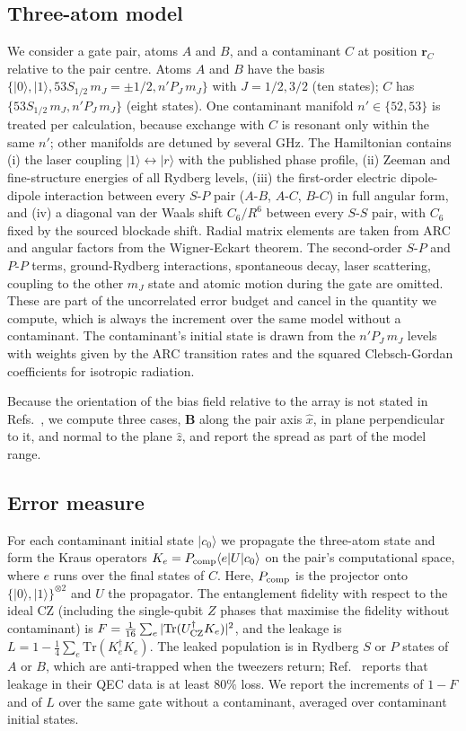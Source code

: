 \documentclass[aps,pra,twocolumn,superscriptaddress,longbibliography,floatfix]{revtex4-2}
\begin{document}
\subsection{Three-atom model}

We consider a gate pair, atoms $A$ and $B$, and a contaminant $C$ at position $\bm r_C$ relative to the pair centre. Atoms $A$ and $B$ have the basis $\{|0\rangle,|1\rangle, 53S_{1/2}\,m_J=\pm1/2, n'P_J\,m_J\}$ with $J=1/2,3/2$ (ten states); $C$ has $\{53S_{1/2}\,m_J, n'P_J\,m_J\}$ (eight states). One contaminant manifold $n'\in\{52,53\}$ is treated per calculation, because exchange with $C$ is resonant only within the same $n'$; other manifolds are detuned by several GHz. The Hamiltonian contains (i) the laser coupling $|1\rangle\leftrightarrow|r\rangle$ with the published phase profile, (ii) Zeeman and fine-structure energies of all Rydberg levels, (iii) the first-order electric dipole-dipole interaction between every $S$-$P$ pair ($A$-$B$, $A$-$C$, $B$-$C$) in full angular form, and (iv) a diagonal van der Waals shift $C_6/R^6$ between every $S$-$S$ pair, with $C_6$ fixed by the sourced blockade shift. Radial matrix elements are taken from ARC and angular factors from the Wigner-Eckart theorem. The second-order $S$-$P$ and $P$-$P$ terms, ground-Rydberg interactions, spontaneous decay, laser scattering, coupling to the other $m_J$ state and atomic motion during the gate are omitted. These are part of the uncorrelated error budget and cancel in the quantity we compute, which is always the increment over the same model without a contaminant. The contaminant's initial state is drawn from the $n'P_J\,m_J$ levels with weights given by the ARC transition rates and the squared Clebsch-Gordan coefficients for isotropic radiation.

Because the orientation of the bias field relative to the array is not stated in Refs.~\cite{Evered2023,Bluvstein2026}, we compute three cases, $\bm B$ along the pair axis $\hat x$, in plane perpendicular to it, and normal to the plane $\hat z$, and report the spread as part of the model range.

\subsection{Error measure}

For each contaminant initial state $|c_0\rangle$ we propagate the three-atom state and form the Kraus operators $K_e=P_{\rm comp}\langle e|U|c_0\rangle$ on the pair's computational space, where $e$ runs over the final states of $C$. Here, $P_{\rm comp}$ is the projector onto $\{|0\rangle,|1\rangle\}^{\otimes2}$ and $U$ the propagator. The entanglement fidelity with respect to the ideal CZ (including the single-qubit $Z$ phases that maximise the fidelity without contaminant) is $F=\frac{1}{16}\sum_e|\mathrm{Tr}(U_{\rm CZ}^\dagger K_e)|^2$, and the leakage is $L=1-\frac14\sum_e\mathrm{Tr}(K_e^\dagger K_e)$. The leaked population is in Rydberg $S$ or $P$ states of $A$ or $B$, which are anti-trapped when the tweezers return; Ref.~\cite{Bluvstein2026} reports that leakage in their QEC data is at least $80\%$ loss. We report the increments of $1-F$ and of $L$ over the same gate without a contaminant, averaged over contaminant initial states.
\end{document}
